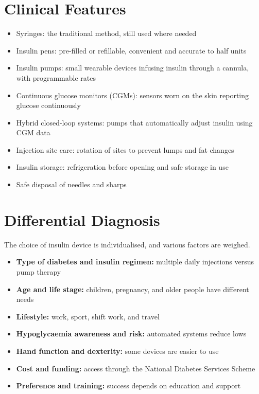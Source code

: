 \section*{Clinical Features}
\begin{itemize}
    \item Syringes: the traditional method, still used where needed
    \item Insulin pens: pre-filled or refillable, convenient and accurate to half units
    \item Insulin pumps: small wearable devices infusing insulin through a cannula, with programmable rates
    \item Continuous glucose monitors (CGMs): sensors worn on the skin reporting glucose continuously
    \item Hybrid closed-loop systems: pumps that automatically adjust insulin using CGM data
    \item Injection site care: rotation of sites to prevent lumps and fat changes
    \item Insulin storage: refrigeration before opening and safe storage in use
    \item Safe disposal of needles and sharps
\end{itemize}

\section*{Differential Diagnosis}
The choice of insulin device is individualised, and various factors are weighed.
\begin{itemize}
    \item \textbf{Type of diabetes and insulin regimen:} multiple daily injections versus pump therapy
    \item \textbf{Age and life stage:} children, pregnancy, and older people have different needs
    \item \textbf{Lifestyle:} work, sport, shift work, and travel
    \item \textbf{Hypoglycaemia awareness and risk:} automated systems reduce lows
    \item \textbf{Hand function and dexterity:} some devices are easier to use
    \item \textbf{Cost and funding:} access through the National Diabetes Services Scheme
    \item \textbf{Preference and training:} success depends on education and support
\end{itemize}

